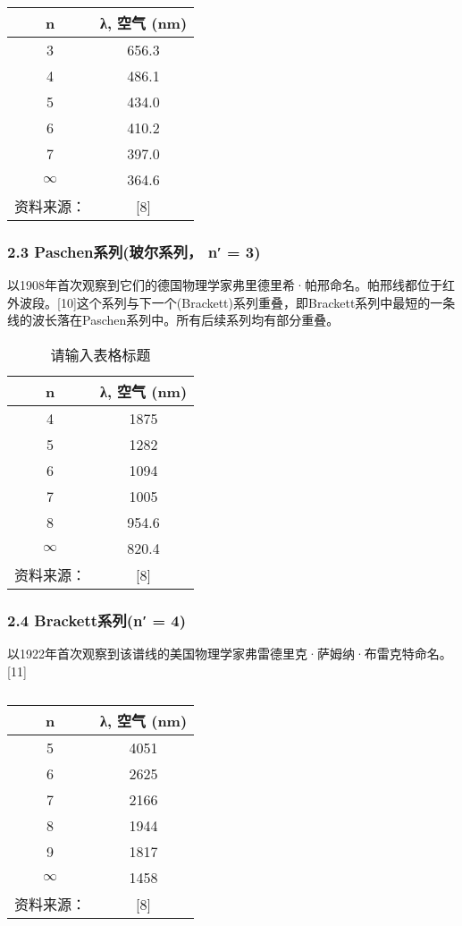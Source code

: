 \begin{table}[ht]
\centering
\caption{ }\label{tab_QYZGP2}
\begin{tabular}{|c|c|}
\hline
n & λ, 空气
(nm) \\
\hline
3 & 656.3 \\
\hline
4 &486.1\\
\hline
5 & 434.0 \\
\hline
6 & 410.2\\
\hline
7 & 397.0 \\
\hline
$\infty$ & 364.6 \\
\hline
资料来源： &[8] \\
\hline
\end{tabular}
\end{table}
\subsubsection{2.3 Paschen系列(玻尔系列， n′ = 3)}
以1908年首次观察到它们的德国物理学家弗里德里希·帕邢命名。帕邢线都位于红外波段。[10]这个系列与下一个(Brackett)系列重叠，即Brackett系列中最短的一条线的波长落在Paschen系列中。所有后续系列均有部分重叠。

\begin{table}[ht]
\centering
\caption{请输入表格标题}\label{tab_QYZGP3}
\begin{tabular}{|c|c|}
\hline
n & λ, 空气
(nm) \\
\hline
4 & 1875 \\
\hline
5 & 1282 \\
\hline
6 & 1094 \\
\hline
7 & 1005 \\
\hline
8 & 954.6 \\
\hline
$\infty$ & 820.4 \\
\hline
资料来源： & [8] \\
\hline
\end{tabular}
\end{table}

\subsubsection{2.4 Brackett系列(n′ = 4)}
以1922年首次观察到该谱线的美国物理学家弗雷德里克·萨姆纳·布雷克特命名。[11]
\begin{table}[ht]
\centering
\caption{ }\label{tab_QYZGP4}
\begin{tabular}{|c|c|}
\hline
n & λ, 空气
(nm)\\
\hline
5 & 4051 \\
\hline
6 & 2625 \\
\hline
7 & 2166\\
\hline
8 & 1944 \\
\hline
9& 1817 \\
\hline
$\infty $& 1458 \\
\hline
资料来源： & [8] \\
\hline
\end{tabular}
\end{table}
